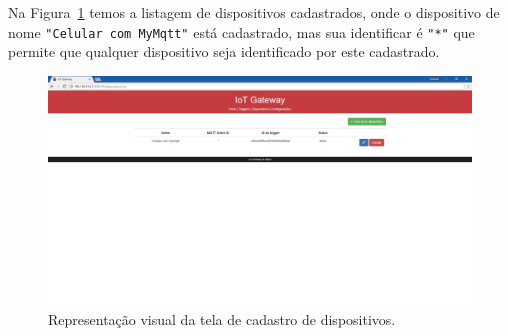 Na Figura~\ref{fig:dispositivoCadastrado} temos a listagem de dispositivos cadastrados, onde o dispositivo de nome \verb|"Celular com MyMqtt"| está cadastrado, mas sua identificar é \verb|"*"| que permite que qualquer dispositivo seja identificado por este cadastrado.
\begin{figure}[h!]
	\begin{center}
		\includegraphics[width=1.085\textwidth]{./img/dispositivoCadastrado}
		\caption{Representação visual da tela de cadastro de dispositivos.}
		\label{fig:dispositivoCadastrado}
	\end{center}
\end{figure}

